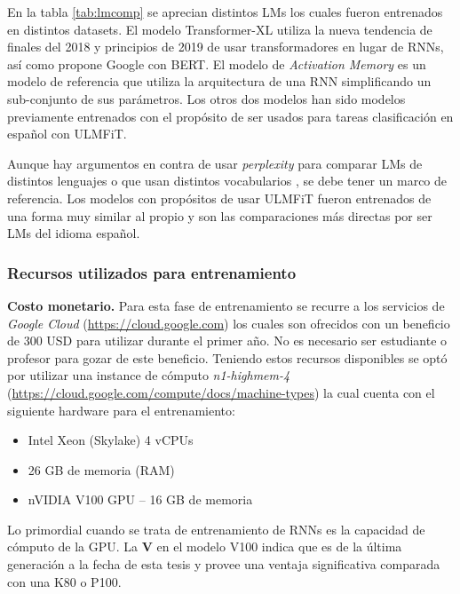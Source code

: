 En la tabla \ref{tab:lmcomp} se aprecian distintos LMs los cuales fueron entrenados en distintos datasets. El modelo Transformer-XL \parencite{dai2019} utiliza la nueva tendencia de finales del 2018 y principios de 2019 de usar transformadores en lugar de RNNs, así como propone Google con BERT. El modelo de \textit{Activation Memory} \parencite{rae2018} es un modelo de referencia que utiliza la arquitectura de una RNN simplificando un sub-conjunto de sus parámetros. Los otros dos modelos han sido modelos previamente entrenados con el propósito de ser usados para tareas clasificación en español con ULMFiT.

Aunque hay argumentos en contra de usar \textit{perplexity} para comparar LMs de distintos lenguajes o que usan distintos vocabularios \parencite{chen1998evaluation}, se debe tener un marco de referencia. Los modelos con propósitos de usar ULMFiT fueron entrenados de una forma muy similar al propio y son las comparaciones más directas por ser LMs del idioma español.


\subsubsection{Recursos utilizados para entrenamiento}

\textbf{Costo monetario.} Para esta fase de entrenamiento se recurre a los servicios de \textit{Google Cloud} (\href{https://cloud.google.com/free}{https://cloud.google.com}) los cuales son ofrecidos con un beneficio de 300 USD para utilizar durante el primer año. No es necesario ser estudiante o profesor para gozar de este beneficio. Teniendo estos recursos disponibles se optó por utilizar una instance de cómputo \emph{n1-highmem-4} (\url{https://cloud.google.com/compute/docs/machine-types}) la cual cuenta con	el siguiente hardware para el entrenamiento:


\begin{itemize}
\item Intel Xeon (Skylake) 4 vCPUs
\item 26 GB de memoria (RAM)
\item nVIDIA V100 GPU -- 16 GB de memoria
\end{itemize}

Lo primordial cuando se trata de entrenamiento de RNNs es la capacidad de cómputo de la GPU. La \textbf{V} en el modelo V100 indica que es de la última generación a la fecha de esta tesis y provee una ventaja significativa comparada con una K80 o P100.

